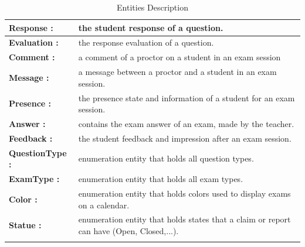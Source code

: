 \documentclass[]{uc2pfecaneva}
\begin{document}
    \clearpage

    \begin{table}[t]
        \begin{tabularx}{\textwidth}{|l|X|}
            \hline
            \textbf{Response :} & the student response of a question.\\ \hline
            \textbf{Evaluation :} & the response evaluation of a question.\\ \hline
            \textbf{Comment :} & a comment of a proctor on a student in an exam session\\ \hline
            \textbf{Message :} & a message between a proctor and a student in an exam session.\\ \hline
            \textbf{Presence :} & the presence state and information of a student for an exam session.\\ \hline
            \textbf{Answer :} & contains the exam answer of an exam, made by the teacher.\\ \hline
            \textbf{Feedback :} & the student feedback and impression after an exam session.\\ \hline
            \textbf{QuestionType :} & enumeration entity that holds all question types.\\ \hline
            \textbf{ExamType :} & enumeration entity that holds all exam types.\\ \hline
            \textbf{Color :} & enumeration entity that holds colors used to display exams on a calendar.\\ \hline
            \textbf{Statue :} & enumeration entity that holds states that a claim or report can have (Open, Closed,...).\\ \hline
            \\ \hline
        \end{tabularx}
        \caption{Entities Description}
        \label{table:1}
    \end{table}
\end{document}
